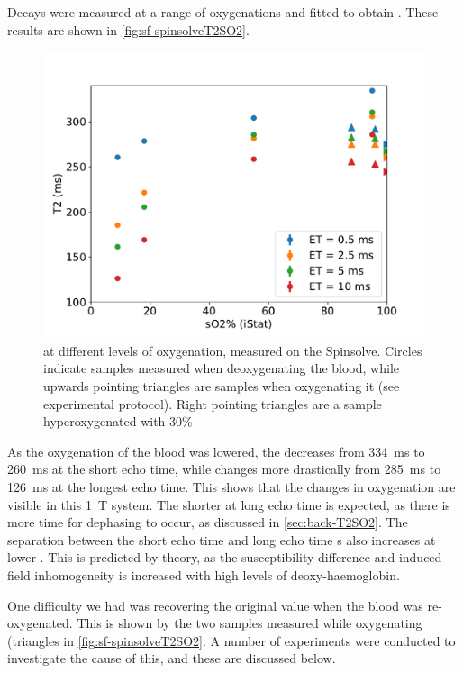 Decays were measured at a range of oxygenations and fitted to obtain \Ttwo.
These results are shown in \autoref{fig:sf-spinsolveT2SO2}.

\begin{figure}[t]
\centering
\includegraphics[width=\textwidth]{figures/stoppedflow/spinsolveT2SO2down.pdf}
\caption[\Ttwo vs. \SOtwo measured on the Spinsolve]{\Ttwo at different levels of oxygenation, measured on the Spinsolve. Circles indicate samples measured when deoxygenating the blood, while upwards pointing triangles are samples when oxygenating it (see experimental protocol). Right pointing triangles are a sample hyperoxygenated with 30\% \Otwo}
\label{fig:sf-spinsolveT2SO2}
\end{figure}

As the oxygenation of the blood was lowered, the \Ttwo decreases from \SI{334}{ms} to \SI{260}{ms} at the short echo time, while changes more drastically from \SI{285}{ms} to \SI{126}{ms} at the longest echo time.
This shows that the changes in oxygenation are visible in this \SI{1}{T} system.
The shorter \Ttwo at long echo time is expected, as there is more time for dephasing to occur, as discussed in \autoref{sec:back-T2SO2}.
The separation between the short echo time and long echo time \Ttwo{}s also increases at lower \SOtwo.
This is predicted by theory, as the susceptibility difference and induced field inhomogeneity is increased with high levels of deoxy-haemoglobin.

One difficulty we had was recovering the original \Ttwo value when the blood was re-oxygenated.
This is shown by the two samples measured while oxygenating (triangles in \autoref{fig:sf-spinsolveT2SO2}.
A number of experiments were conducted to investigate the cause of this, and these are discussed below.

